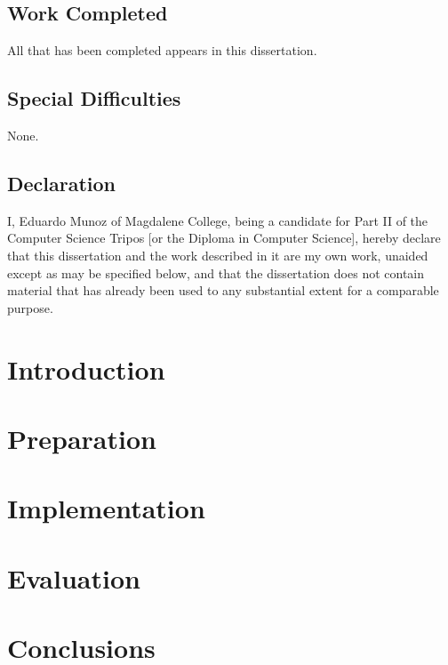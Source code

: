 \documentclass[12pt, a4paper, twoside, openright, notitlepage]{report}
\begin{document}
\section*{Work Completed}

All that has been completed appears in this dissertation.

\section*{Special Difficulties}

None.

\newpage
\section*{Declaration}

I, Eduardo Munoz of Magdalene College, being a candidate for Part II of the Computer
Science Tripos [or the Diploma in Computer Science], hereby declare
that this dissertation and the work described in it are my own work,
unaided except as may be specified below, and that the dissertation
does not contain material that has already been used to any substantial
extent for a comparable purpose.

\bigskip
{}
\bigskip

\medskip
{}

\cleardoublepage

\tableofcontents

\newpage

\setcounter{page}{1}
\pagestyle{headings}

\chapter{Introduction}
\chapter{Preparation}
\chapter{Implementation}
\chapter{Evaluation}
\chapter{Conclusions}
\end{document}
